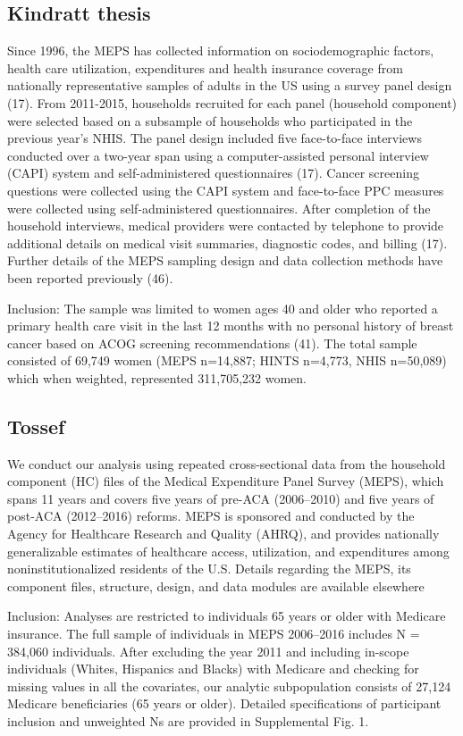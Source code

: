 \documentclass[../main.tex]{subfiles}
\begin{document}
\subsection{Kindratt thesis}
Since 1996, the MEPS has collected information on sociodemographic factors, health care utilization, expenditures and health insurance coverage from nationally representative samples of adults in the US using a survey panel design (17). From 2011-2015, households recruited for each panel (household component) were selected based on a subsample of households who participated in the previous year’s NHIS. The panel design included five face-to-face interviews conducted over a two-year span using a computer-assisted personal interview (CAPI) system and self-administered questionnaires (17). Cancer screening questions were collected using the CAPI system and face-to-face PPC measures were collected using self-administered questionnaires. After completion of the household interviews, medical providers were contacted by telephone to provide additional details on medical visit summaries, diagnostic codes, and billing (17). Further details of the MEPS sampling design and data collection methods have been reported previously (46).

Inclusion:
The sample was limited to women ages 40 and older who reported a primary health care visit in the last 12 months with no personal history of breast cancer based on ACOG screening recommendations (41). The total sample consisted of 69,749 women (MEPS n=14,887; HINTS n=4,773, NHIS n=50,089) which when weighted, represented 311,705,232 women.


\subsection{Tossef}

We conduct our analysis using repeated cross-sectional data from the household component (HC) files of the Medical Expenditure Panel Survey (MEPS), which spans 11 years and covers five years of pre-ACA (2006–2010) and five years of post-ACA (2012–2016) reforms. MEPS is sponsored and conducted by the Agency for Healthcare Research and Quality (AHRQ), and provides nationally generalizable estimates of healthcare access, utilization, and expenditures among noninstitutionalized residents of the U.S. Details regarding the MEPS, its component files, structure, design, and data modules are available elsewhere

Inclusion: 
Analyses are restricted to individuals 65 years or older with Medicare insurance. The full sample of individuals in MEPS 2006–2016 includes N = 384,060 individuals. After excluding the year 2011 and including in-scope individuals (Whites, Hispanics and Blacks) with Medicare and checking for missing values in all the covariates, our analytic subpopulation consists of 27,124 Medicare beneficiaries (65 years or older). Detailed specifications of participant inclusion and unweighted Ns are provided in Supplemental Fig. 1.
\end{document}
